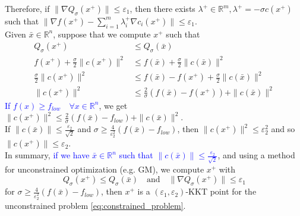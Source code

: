 \documentclass[12pt, openany]{report}
\newcommand{\R}{\mathbb{R}}
\theoremstyle{definition}
\begin{document}
Therefore, if $\| \nabla Q_{\sigma} (x^+) \| \leq \varepsilon_1$, then there exists $\lambda^+ \in \R^m, \lambda^+ = - \sigma c(x^+)$ such that $\|\nabla f(x^+) - \displaystyle \sum_{i=1}^{m} \lambda_i^+ \nabla c_i(x^+)\| \leq \varepsilon_1$.\\
Given $\bar{x} \in \R^n$, suppose that we compute $x^+$ such that
\begin{equation}
	\begin{aligned}
		Q_\sigma(x^+) &\leq Q_\sigma(\bar{x})\\
		f(x^+) + \frac{\sigma}{2} \|c(x^+)\|^2 &\leq f(\bar{x}) + \frac{\sigma}{2} \|c(\bar{x})\|^2\\
		\frac{\sigma}{2} \|c(x^+)\|^2 &\leq f(\bar{x}) - f(x^+) + \frac{\sigma}{2} \|c(\bar{x})\|^2\\
		\|c(x^+)\|^2 &\leq \frac{2}{\sigma} \left( f(\bar{x}) - f(x^+) \right) + \|c(\bar{x})\|^2
	\end{aligned}
\end{equation}
\textcolor{blue}{If $f(x) \geq f_{low} \quad \forall x \in \R^n$}, we get $\|c(x^+)\|^2 \leq \frac{2}{\sigma} (f(\bar{x}) - f_{low}) + \|c(\bar{x})\|^2$.\\
If $\|c(\bar{x})\| \leq \frac{\varepsilon_2}{\sqrt{2}}$ and $\sigma \geq \frac{4}{\varepsilon_2^2} (f(\bar{x})-f_{low})$, then $\|c(x^+)\|^2 \leq \varepsilon_2^2$ and so $\|c(x^+)\| \leq \varepsilon_2$.\\
In summary, \textcolor{blue}{if we have $\bar{x} \in \R^n$ such that $\|c(\bar{x})\| \leq \frac{\varepsilon_2}{\sqrt{2}}$}, and using a method for unconstrained optimization (e.g. GM), we compute $x^+$ with
\begin{equation}
	Q_\sigma(x^+) \leq Q_\sigma(\bar{x}) \quad \text{and} \quad \|\nabla Q_\sigma(x^+)\| \leq \varepsilon_1
\end{equation}
for $\sigma \geq \frac{4}{\varepsilon_2^2} (f(\bar{x})-f_{low})$, then $x^+$ is a $(\varepsilon_1,\varepsilon_2)$-KKT point for the unconstrained problem \eqref{eq:constrained_problem}.\\
\newline
\end{document}
